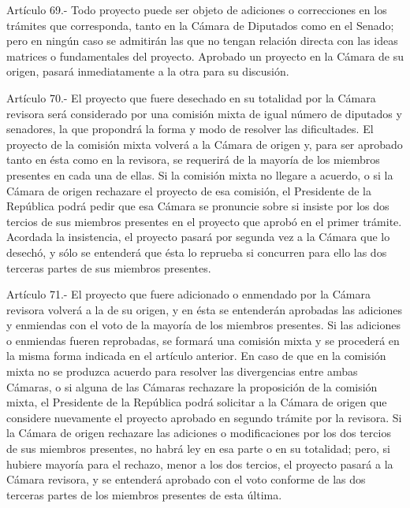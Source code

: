     Artículo 69.- Todo proyecto puede ser objeto de adiciones o correcciones en los trámites que corresponda, tanto en la Cámara de Diputados como en el Senado; pero en ningún caso se admitirán las que no tengan relación directa con las ideas matrices o fundamentales del proyecto.
    Aprobado un proyecto en la Cámara de su origen, pasará inmediatamente a la otra para su discusión.



    Artículo 70.- El proyecto que fuere desechado en su totalidad por la Cámara revisora será considerado por una comisión mixta de igual número de diputados y senadores, la que propondrá la forma y modo de resolver las dificultades. El proyecto de la comisión mixta volverá a la Cámara de origen y, para ser aprobado tanto en ésta como en la revisora, se requerirá de la mayoría de los miembros presentes en cada una de ellas. Si la comisión mixta no llegare a acuerdo, o si la Cámara de origen rechazare el proyecto de esa comisión, el Presidente de la República podrá pedir que esa Cámara se pronuncie sobre si insiste por los dos tercios de sus miembros presentes en el proyecto que aprobó en el primer trámite. Acordada la insistencia, el proyecto pasará por segunda vez a la Cámara que lo desechó, y sólo se entenderá que ésta lo reprueba si concurren para ello las dos terceras partes de sus miembros presentes.



    Artículo 71.- El proyecto que fuere adicionado o enmendado por la Cámara revisora volverá a la de su origen, y en ésta se entenderán aprobadas las adiciones y enmiendas con el voto de la mayoría de los miembros presentes.
    Si las adiciones o enmiendas fueren reprobadas, se formará una comisión mixta y se procederá en la misma forma indicada en el artículo anterior. En caso de que en la comisión mixta no se produzca acuerdo para resolver las divergencias entre ambas Cámaras, o si alguna de las Cámaras rechazare la proposición de la comisión mixta, el Presidente de la República podrá solicitar a la Cámara de origen que considere nuevamente el proyecto aprobado en segundo trámite por la revisora. Si la Cámara de origen rechazare las adiciones o modificaciones por los dos tercios de sus miembros presentes, no habrá ley en esa parte o en su totalidad; pero, si hubiere mayoría para el rechazo, menor a los dos tercios, el proyecto pasará a la Cámara revisora, y se entenderá aprobado con el voto conforme de las dos terceras partes de los miembros presentes de esta última.




